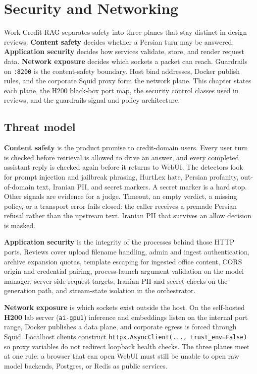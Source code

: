 \chapter{Security and Networking}\label{security-and-networking}

Work Credit RAG separates safety into three planes that stay distinct in design reviews. \textbf{Content safety} decides whether a Persian turn may be answered. \textbf{Application security} decides how services validate, store, and render request data. \textbf{Network exposure} decides which sockets a packet can reach. Guardrails on \texttt{:8200} is the content-safety boundary. Host bind addresses, Docker publish rules, and the corporate Squid proxy form the network plane. This chapter states each plane, the H200 black-box port map, the security control classes used in reviews, and the guardrails signal and policy architecture.

\section{Threat model}\label{threat-model}

\textbf{Content safety} is the product promise to credit-domain users. Every user turn is checked before retrieval is allowed to drive an answer, and every completed assistant reply is checked again before it returns to WebUI. The detectors look for prompt injection and jailbreak phrasing, HurtLex hate, Persian profanity, out-of-domain text, Iranian PII, and secret markers. A secret marker is a hard stop. Other signals are evidence for a judge. Timeout, an empty verdict, a missing policy, or a transport error fails closed: the caller receives a premade Persian refusal rather than the upstream text. Iranian PII that survives an allow decision is masked.

\textbf{Application security} is the integrity of the processes behind those HTTP ports. Reviews cover upload filename handling, admin and ingest authentication, archive expansion quotas, template escaping for ingested office content, CORS origin and credential pairing, process-launch argument validation on the model manager, server-side request targets, Iranian PII and secret checks on the generation path, and stream-state isolation in the orchestrator.

\textbf{Network exposure} is which sockets exist outside the host. On the self-hosted \textbf{H200} lab server (\texttt{ai-gpu1}) inference and embeddings listen on the internal port range, Docker publishes a data plane, and corporate egress is forced through Squid. Localhost clients construct \texttt{httpx.AsyncClient(...,\ trust\_env=False)} so proxy variables do not redirect loopback health checks. The three planes meet at one rule: a browser that can open WebUI must still be unable to open raw model backends, Postgres, or Redis as public services.

